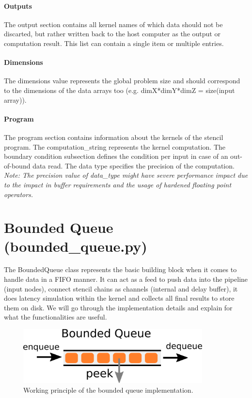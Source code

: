 \paragraph{Outputs}
The output section contains all kernel names of which data should not be discarted, but rather written back to the host computer as the output or computation result. This list can contain a single item or multiple entries.


\paragraph{Dimensions}
The dimensions value represents the global problem size and should correspond to the dimensions of the data arrays too (e.g. dimX*dimY*dimZ = size(input array)).


\paragraph{Program}
The program section contains information about the kernels of the stencil program. The computation\_string represents the kernel computation. The boundary condition subsection defines the condition per input in case of an out-of-bound data read. The data type specifies the precision of the computation. \\
\textit{Note: The precision value of data\_type might have severe performance impact  due to the impact in buffer requirements and the usage of hardened floating point operators.}






\section{Bounded Queue (bounded\_queue.py)}
The BoundedQueue class represents the basic building block when it comes to handle data in a FIFO manner. It can act as a feed to push data into the pipeline (input nodes), connect stencil chains as channels (internal and delay buffer), it does latency simulation within the kernel and collects all final results to store them on disk. We will go through the implementation details and explain for what the functionalities are useful. 

\begin{figure}[h]
	\centering
	\includegraphics[height=8em]{drawings/implementation-bounded-queue.png}
	\caption{Working principle of the bounded queue implementation.}
	\label{fig:implementation-bounded-queue}
\end{figure}

